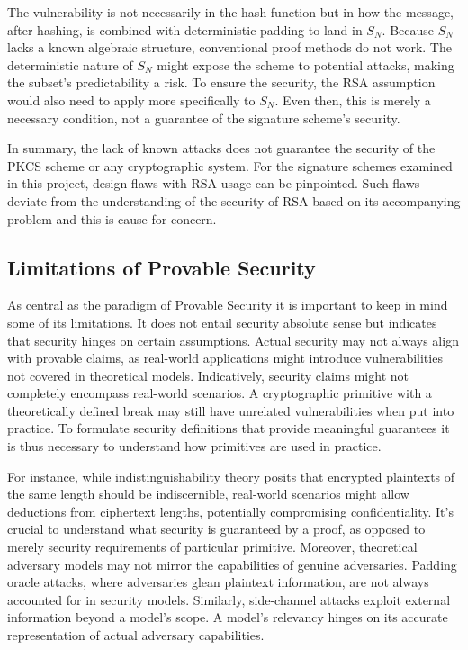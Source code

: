 \documentclass[]{final_report}
\theoremstyle{definition}
\begin{document}
The vulnerability is not necessarily in the hash function but in how the message, after hashing, is combined with deterministic padding to land in \( S_N \). Because \( S_N \) lacks a known algebraic structure, conventional proof methods do not work. The deterministic nature of \( S_N \) might expose the scheme to potential attacks, making the subset's predictability a risk. To ensure the security, the RSA assumption would also need to apply more specifically to  $S_N$. Even then, this is merely a necessary condition, not a guarantee of the signature scheme's security. 

In summary, the lack of known attacks does not guarantee the security of the PKCS scheme or any cryptographic system. For the signature schemes examined in this project, design flaws with RSA usage can be pinpointed. Such flaws deviate from the understanding of the security of RSA based on its accompanying problem and this is cause for concern.


\subsection{Limitations of Provable Security}
As central as the paradigm of Provable Security it is important to keep in mind some of its limitations. It does not entail security absolute sense but indicates that security hinges on certain assumptions. Actual security may not always align with provable claims, as real-world applications might introduce vulnerabilities not covered in theoretical models. Indicatively, security claims might not completely encompass real-world scenarios. A cryptographic primitive with a theoretically defined break may still have unrelated vulnerabilities when put into practice. To formulate security definitions that provide meaningful guarantees it is thus necessary to understand how primitives are used in practice.

For instance, while indistinguishability theory posits that encrypted plaintexts of the same length should be indiscernible, real-world scenarios might allow deductions from ciphertext lengths, potentially compromising confidentiality. It's crucial to understand what security is guaranteed by a proof, as opposed to merely security requirements of particular primitive. Moreover, theoretical adversary models may not mirror the capabilities of genuine adversaries. Padding oracle attacks, where adversaries glean plaintext information, are not always accounted for in security models. Similarly, side-channel attacks exploit external information beyond a model's scope. A model's relevancy hinges on its accurate representation of actual adversary capabilities.
\end{document}
